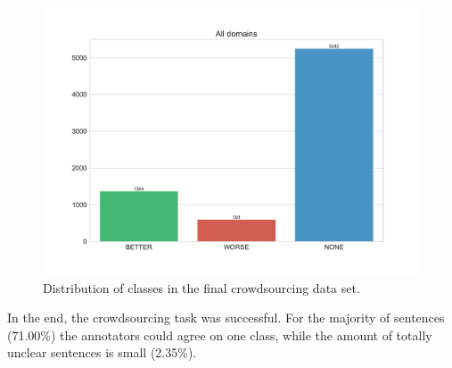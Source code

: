 \begin{figure}[htbp]
\centering
\caption{Distribution of classes in the final crowdsourcing data set.}
\label{fig:all_fin}
\includegraphics[width=1\textwidth]{images/dataset/Alldomains-dist}
\end{figure}

In the end, the crowdsourcing task was successful. For the majority of sentences (71.00\%) the annotators could agree on one class, while the amount of totally unclear sentences is small (2.35\%).
\FloatBarrier